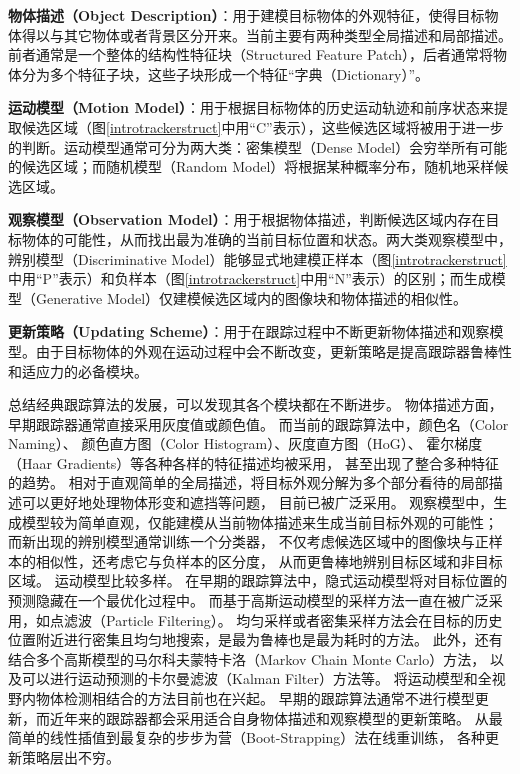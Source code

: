 \begin{compactitem}
\item	\textbf{物体描述（Object Description）}：用于建模目标物体的外观特征，使得目标物体得以与其它物体或者背景区分开来。当前主要有两种类型\pozhehao 全局描述和局部描述。前者通常是一个整体的结构性特征块（Structured Feature Patch），后者通常将物体分为多个特征子块，这些子块形成一个特征“字典（Dictionary）”。
\item	\textbf{运动模型（Motion Model）}：用于根据目标物体的历史运动轨迹和前序状态来提取候选区域（图\ref{introtrackerstruct}中用``C''表示），这些候选区域将被用于进一步的判断。运动模型通常可分为两大类：密集模型（Dense Model）会穷举所有可能的候选区域；而随机模型（Random Model）将根据某种概率分布，随机地采样候选区域。
\item	\textbf{观察模型（Observation Model）}：用于根据物体描述，判断候选区域内存在目标物体的可能性，从而找出最为准确的当前目标位置和状态。两大类观察模型中，辨别模型（Discriminative Model）能够显式地建模正样本（图\ref{introtrackerstruct}中用``P''表示）和负样本（图\ref{introtrackerstruct}中用``N''表示）的区别；而生成模型（Generative Model）仅建模候选区域内的图像块和物体描述的相似性。
\item	\textbf{更新策略（Updating Scheme）}：用于在跟踪过程中不断更新物体描述和观察模型。由于目标物体的外观在运动过程中会不断改变，更新策略是提高跟踪器鲁棒性和适应力的必备模块。
\end{compactitem}

总结经典跟踪算法的发展，可以发现其各个模块都在不断进步。
物体描述方面，早期跟踪器通常直接采用灰度值或颜色值。
而当前的跟踪算法中，颜色名（Color Naming）、
颜色直方图（Color Histogram）、灰度直方图（HoG）、
霍尔梯度（Haar Gradients）等各种各样的特征描述均被采用，
甚至出现了整合多种特征的趋势。
相对于直观简单的全局描述，将目标外观分解为多个部分看待的局部描述可以更好地处理物体形变和遮挡等问题，
目前已被广泛采用。
观察模型中，生成模型较为简单直观，仅能建模从当前物体描述来生成当前目标外观的可能性；
而新出现的辨别模型通常训练一个分类器，
不仅考虑候选区域中的图像块与正样本的相似性，还考虑它与负样本的区分度，
从而更鲁棒地辨别目标区域和非目标区域。
运动模型比较多样。
在早期的跟踪算法中，隐式运动模型将对目标位置的预测隐藏在一个最优化过程中。
而基于高斯运动模型的采样方法一直在被广泛采用，如点滤波（Particle Filtering）。
均匀采样或者密集采样方法会在目标的历史位置附近进行密集且均匀地搜索，是最为鲁棒也是最为耗时的方法。
此外，还有结合多个高斯模型的马尔科夫蒙特卡洛（Markov Chain Monte Carlo）方法，
以及可以进行运动预测的卡尔曼滤波（Kalman Filter）方法等。
将运动模型和全视野内物体检测相结合的方法目前也在兴起。
早期的跟踪算法通常不进行模型更新，而近年来的跟踪器都会采用适合自身物体描述和观察模型的更新策略。
从最简单的线性插值到最复杂的步步为营（Boot-Strapping）法在线重训练，
各种更新策略层出不穷。

